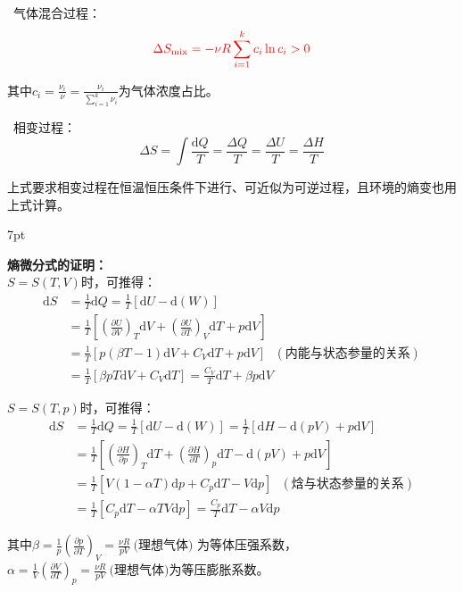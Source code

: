 \documentclass[zihao=5,UTF8]{report}
\newenvironment{graybox}{%
\def\FrameCommand{%
\hspace{1pt}%
{\color{gray}\small \vrule width 2pt}%
{\color{graybox_color}\vrule width 4pt}%
\colorbox{graybox_color}%
}%
\MakeFramed{\advance\hsize-\width\FrameRestore}%
\noindent\hspace{-4.55pt}%
\begin{adjustwidth}{}{7pt}%
\vspace{2pt}\vspace{2pt}%
}
{%
\vspace{2pt}\end{adjustwidth}\endMakeFramed%
}
\begin{document}
\noindent{}\ 气体混合过程：
\begin{equation}
    {\color{red}\Delta S_{\text{mix}} = - \nu R \sum_{i=1}^{k}c_i\ln c_i >0}
\end{equation}
{\par\color{gray}\small
其中$c_i = \frac{\nu_i}{\nu} = \frac{\nu_i}{\sum_{i=1}^{k}\nu_i}$为气体浓度占比。
\par}
\noindent{}\ 相变过程：
\begin{equation}
    \Delta S = \int \frac{\mathrm{d}Q}{T} = \frac{\Delta Q}{T} =  \frac{\Delta U}{T} =  \frac{\Delta H}{T}
\end{equation}
{\par\color{gray}\small
上式要求相变过程在恒温恒压条件下进行、可近似为可逆过程，且环境的熵变也用上式计算。
\par}

\begin{graybox}
    \textbf{熵微分式的证明：}\\
    $S = S(T,V)$时，可推得：
    \begin{align*}
        \mathrm{d}S &= \frac{1}{T}\mathrm{d}Q = \frac{1}{T}\left[\mathrm{d}U - \mathrm{d}(W)\right]\\
        & = \frac{1}{T}\left[  \left(\frac{\partial U}{\partial V} \right)_T\mathrm{d}V + \left(\frac{\partial U}{\partial T} \right)_V\mathrm{d}T   + p\mathrm{d}V\right]\\
        &= \frac{1}{T} \left[ p(\beta  T-1)\mathrm{d}V+ C_V\mathrm{d}T + p\mathrm{d}V \right] \ \ \ (\text{内能与状态参量的关系})\\
        & = \frac{1}{T}\left[ \beta  pT\mathrm{d}V+ C_V\mathrm{d}T \right] =  \frac{C_V}{T}\mathrm{d}T + \beta  p \mathrm{d}V
    \end{align*}\par
    $S = S(T,p)$时，可推得：
    \begin{align*}
        \mathrm{d}S &= \frac{1}{T}\mathrm{d}Q 
        = \frac{1}{T}\left[\mathrm{d}U - \mathrm{d}(W)\right]
        = \frac{1}{T}\left[ \mathrm{d}H - \mathrm{d}(pV)   + p\mathrm{d}V\right]  \\
        &= \frac{1}{T}\left[ \left(\frac{\partial H}{\partial p} \right)_T\mathrm{d}T + \left(\frac{\partial H}{\partial T} \right)_p\mathrm{d}T - \mathrm{d}(pV)   + p\mathrm{d}V\right]\\
        &= \frac{1}{T} \left[ V(1- \alpha T)\mathrm{d}p+ C_p\mathrm{d}T - V\mathrm{d}p \right] \ \ \ (\text{焓与状态参量的关系})\\
        & = \frac{1}{T}\left[   C_p\mathrm{d}T - \alpha TV\mathrm{d}p \right] = \frac{C_p}{T}\mathrm{d}T - \alpha V\mathrm{d}p
    \end{align*}\par
    其中$\beta = \frac{1}{p}\left(\frac{\partial p}{\partial T} \right)_V = \frac{\nu R}{pV}\ \text{(理想气体)}$ 为等体压强系数，$\alpha= \frac{1}{V}\left(\frac{\partial V}{\partial T} \right)_p = \frac{\nu R}{pV} \ \text{(理想气体)}$为等压膨胀系数。
\end{graybox}
    
\end{document}

